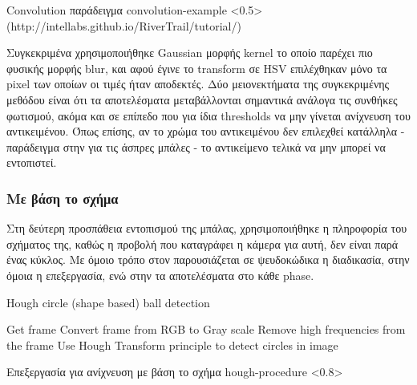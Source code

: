 %
{Convolution παράδειγμα}%
{convolution-example}%
<0.5>%
(http://intellabs.github.io/RiverTrail/tutorial/)

Συγκεκριμένα χρησιμοποιήθηκε Gaussian μορφής kernel το οποίο παρέχει πιο φυσικής μορφής blur, και αφού έγινε το transform σε HSV επιλέχθηκαν μόνο τα pixel των οποίων οι τιμές ήταν αποδεκτές. Δύο μειονεκτήματα της συγκεκριμένης μεθόδου είναι ότι τα αποτελέσματα μεταβάλλονται σημαντικά ανάλογα τις συνθήκες φωτισμού, ακόμα και σε επίπεδο που για ίδια thresholds να μην γίνεται ανίχνευση του α\-ντι\-κει\-μέ\-νου. Όπως επίσης, αν το χρώμα του αντικειμένου δεν επιλεχθεί κατάλληλα - παράδειγμα στην  για τις άσπρες μπάλες - το αντικείμενο τελικά να μην μπορεί να εντοπιστεί. 


\subsubsection{Με βάση το σχήμα}

Στη δεύτερη προσπάθεια εντοπισμού της μπάλας, χρησιμοποιήθηκε η πληροφορία του σχήματος της, καθώς η προβολή που καταγράφει η κάμερα για αυτή, δεν είναι παρά ένας κύκλος. Με όμοιο τρόπο στον  παρουσιάζεται σε ψευδοκώδικα η διαδικασία, στην  όμοια η επεξεργασία, ενώ στην  τα αποτελέσματα στο κάθε phase.

\begin{algorithm}[H]
	\caption[Hough circle (shape based) ball detection]{Hough circle (shape based) ball detection}\label{alg:hough-detect}
	\begin{algorithmic}[1]
                \State Get frame
                \State Convert frame from RGB to Gray scale
                \State Remove high frequencies from the frame
                \State Use Hough Transform principle to detect circles in image 
            \EndFor
	\end{algorithmic}
\end{algorithm}

%
{Επεξεργασία για ανίχνευση με βάση το σχήμα}%
{hough-procedure}%
<0.8>

